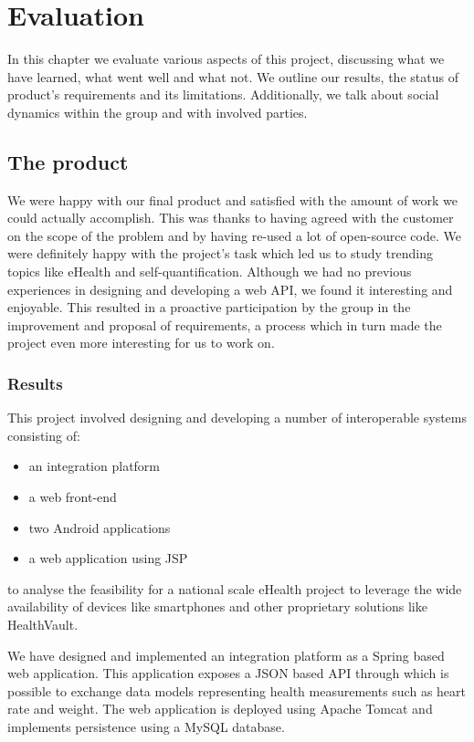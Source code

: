 
\chapter{Evaluation} 
\label{ch:evaluation}


In this chapter we evaluate various aspects of this project, discussing what we
have learned, what went well and what not.
We outline our results, the status of product's requirements and its limitations.
Additionally, we talk about social dynamics within the group and with involved parties.

\section{The product}

We were happy with our final product and satisfied with the amount of work we could actually accomplish.
This was thanks to having agreed with the customer on the scope of the problem and by having re-used a
lot of open-source code. We were definitely happy with the project's task which led us to study trending topics
like eHealth and self-quantification. Although we had no previous experiences in designing and developing a web API,
we found it interesting and enjoyable. This resulted in a proactive participation by the group
in the improvement and proposal of requirements, a process which in turn made the project even more interesting
for us to work on.

\subsection{Results}

This project involved designing and developing a number of interoperable systems consisting of:
\begin{itemize}
\item an integration platform
\item a web front-end
\item two Android applications
\item a web application using JSP
\end{itemize}
to analyse the feasibility for a national scale eHealth project to leverage the wide availability of devices
like smartphones and other proprietary solutions like HealthVault.

We have designed and implemented an integration platform as a Spring based web application.
This application exposes a JSON based API through which is possible to exchange data models
representing health measurements such as heart rate and weight.
The web application is deployed using Apache Tomcat and implements persistence using a MySQL database.

